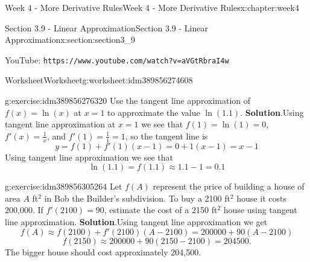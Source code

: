 \documentclass[oneside,10pt,]{book}
\newcommand{\blocktitlefont}{\relax}
\newcommand{\mono}[1]{\texttt{#1}}
\numberwithin{equation}{section}
\newlength{\qrsize}
\newlength{\previewwidth}
\begin{document}
\begin{chapterptx}{Week 4 - More Derivative Rules}{}{Week 4 - More Derivative Rules}{}{}{x:chapter:week4}
\begin{sectionptx}{Section 3.9 - Linear Approximation}{}{Section 3.9 - Linear Approximation}{}{}{x:section:section3_9}
\begin{tcbraster}[raster columns=2, raster column skip=1pt, raster halign=center, raster force size=false, raster left skip=0pt, raster right skip=0pt]
\begin{tcolorbox}[previewstyle, width=\previewwidth]
\end{tcolorbox}%
\begin{tcolorbox}[qrstyle]%
{\hypersetup{urlcolor=black}}%
\end{tcolorbox}%
\begin{tcolorbox}[captionstyle]%
\small YouTube: \mono{https://www.youtube.com/watch?v=aVGtRbraI4w}\end{tcolorbox}%
\end{tcbraster}%
%
%
\typeout{************************************************}
\typeout{************************************************}
%
\begin{worksheet-subsection}{Worksheet}{}{Worksheet}{}{}{g:worksheet:idm389856274608}
\begin{divisionexercise}{1}{}{}{g:exercise:idm389856276320}%
Use the tangent line approximation of \(f(x)=\ln(x)\) at \(x=1\) to approximate the value \(\ln(1.1)\).%
\textbf{\blocktitlefont Solution}.\hypertarget{g:solution:idm389856277072}{}\quad{}Using tangent line approximation at \(x=1\) we see that \(f(1)=\ln(1)=0\), \(f'(x) = \frac 1x\), and \(f'(1) = \frac 11 = 1\), so the tangent line is%
\begin{equation*}
y = f(1)+f'(1)(x-1) = 0 + 1(x-1) = x-1 
\end{equation*}
Using tangent line approximation we see that%
\begin{equation*}
\ln(1.1) = f(1.1) \approx 1.1-1 = 0.1 
\end{equation*}
%
\end{divisionexercise}%
\begin{divisionexercise}{2}{}{}{g:exercise:idm389856305264}%
Let \(f(A)\) represent the price of building a house of area \(A\) ft\(^2\) in Bob the Builder's subdivision. To buy a 2100 ft\(^2\) house it costs \textdollar{}200,000. If \(f'(2100)=90\), estimate the cost of a 2150 ft\(^2\) house using tangent line approximation.%
\textbf{\blocktitlefont Solution}.\hypertarget{g:solution:idm389856324464}{}\quad{}Using tangent line approximation we get%
\begin{equation*}
f(A)\approx f(2100)+f'(2100)(A-2100) = 200000+90(A-2100)
\end{equation*}
%
\begin{equation*}
f(2150)\approx 200000+90(2150-2100) = 204500\text{.}
\end{equation*}
The bigger house should cost approximately \textdollar{}204,500.%

\end{divisionexercise}
\end{worksheet-subsection}
\end{sectionptx}
\end{chapterptx}
\end{document}
